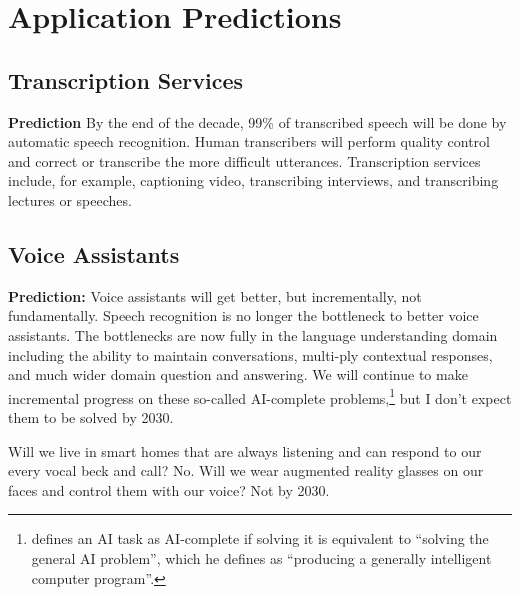 \section{Application Predictions}
\label{sec:application_predictions}

\subsection{Transcription Services}

{\bf Prediction} By the end of the decade, 99\% of transcribed speech will be
done by automatic speech recognition. Human transcribers will perform quality
control and correct or transcribe the more difficult utterances. Transcription
services include, for example, captioning video, transcribing interviews, and
transcribing lectures or speeches.

\subsection{Voice Assistants}

{\bf Prediction:} Voice assistants will get better, but incrementally, not
fundamentally. Speech recognition is no longer the bottleneck to better voice
assistants. The bottlenecks are now fully in the language understanding domain
including the ability to maintain conversations, multi-ply contextual
responses, and much wider domain question and answering. We will continue to
make incremental progress on these so-called AI-complete
problems,\footnote{\citet[sec. 4]{shapiro1992encyclopedia} defines an AI task as
AI-complete if solving it is equivalent to ``solving the general AI problem'',
which he defines as ``producing a generally intelligent computer program''.}
but I don't expect them to be solved by 2030.

Will we live in smart homes that are always listening and can respond to our
every vocal beck and call? No. Will we wear augmented reality glasses on our
faces and control them with our voice? Not by 2030.

